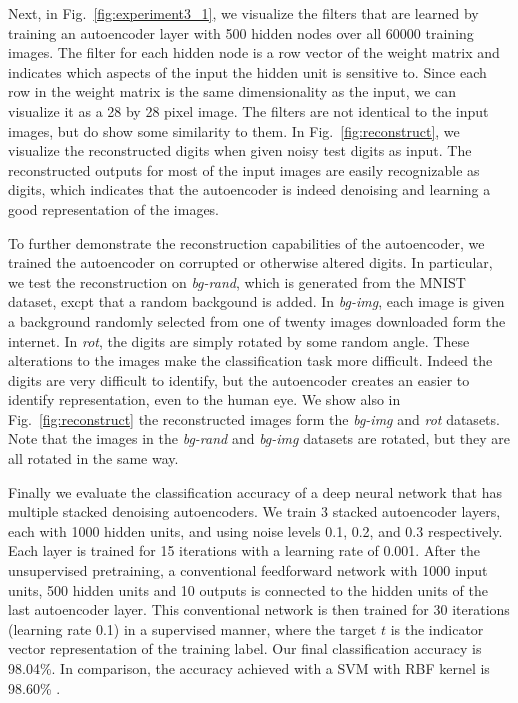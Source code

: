 Next, in Fig.~\ref{fig:experiment3_1}, we visualize the filters that are
learned by training an autoencoder layer with 500 hidden nodes over all 60000
training images. The  filter for each hidden node is a row vector of the weight
matrix and indicates which aspects of the input the hidden unit is sensitive
to. Since each row in the weight matrix is the same dimensionality as the
input, we can visualize it as a 28 by 28 pixel image. The filters are not
identical to the input images, but do show some similarity to them. In
Fig.~\ref{fig:reconstruct}, we visualize the reconstructed digits when given
noisy test digits as input. The reconstructed outputs for most of the input
images are easily recognizable as digits, which indicates that the autoencoder
is indeed denoising and learning a good representation of the images.

To further demonstrate the reconstruction capabilities of the autoencoder, we 
trained the autoencoder on corrupted or otherwise altered digits.
In particular, we test the reconstruction
on \textit{bg-rand}, which is generated from the MNIST dataset, excpt that
a random backgound is added. In \textit{bg-img}, each image is given a background
randomly selected from one of twenty images downloaded form the internet. In 
\textit{rot}, the digits are simply rotated by some random angle.
These alterations to the images make the classification task more difficult. Indeed the
digits are very difficult to identify, but the autoencoder creates an easier to identify 
representation, even to the human eye. We show also in Fig.~\ref{fig:reconstruct} 
the reconstructed images form the \textit{bg-img} and \textit{rot} datasets. Note that
the images in the \textit{bg-rand} and \textit{bg-img} datasets are rotated, but they
are all rotated in the same way.



Finally we evaluate the classification accuracy of a deep neural network that
has multiple stacked denoising autoencoders. We train 3 stacked autoencoder
layers, each with 1000 hidden units, and using noise levels 0.1, 0.2, and 0.3
respectively. Each layer is trained for 15 iterations with a learning rate of
0.001. After the unsupervised pretraining, a conventional feedforward network
with 1000 input units, 500 hidden units and 10 outputs is connected to the
hidden units of the last autoencoder layer. This conventional network is then
trained for 30 iterations (learning rate 0.1) in a supervised manner, where the
target $t$ is the indicator vector representation of the training label. Our
final classification accuracy is 98.04\%. In comparison, the accuracy achieved
with a SVM with RBF kernel is 98.60\% \cite{vincent2010stacked}.

